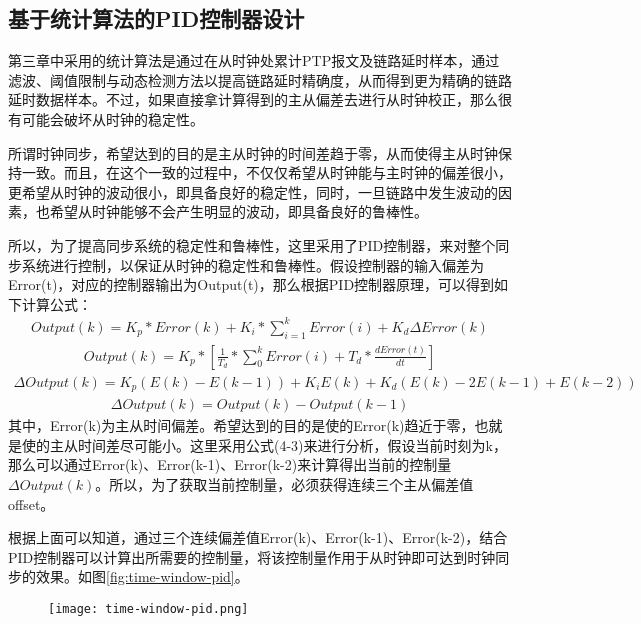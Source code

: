 \subsection{基于统计算法的PID控制器设计}
第三章中采用的统计算法是通过在从时钟处累计PTP报文及链路延时样本，通过滤波、阈值限制与动态检测方法以提高链路延时精确度，从而得到更为精确的链路延时数据样本。不过，如果直接拿计算得到的主从偏差去进行从时钟校正，那么很有可能会破坏从时钟的稳定性。

所谓时钟同步，希望达到的目的是主从时钟的时间差趋于零，从而使得主从时钟保持一致。而且，在这个一致的过程中，不仅仅希望从时钟能与主时钟的偏差很小，更希望从时钟的波动很小，即具备良好的稳定性，同时，一旦链路中发生波动的因素，也希望从时钟能够不会产生明显的波动，即具备良好的鲁棒性。

所以，为了提高同步系统的稳定性和鲁棒性，这里采用了PID控制器，来对整个同步系统进行控制，以保证从时钟的稳定性和鲁棒性。假设控制器的输入偏差为Error(t)，对应的控制器输出为Output(t)，那么根据PID控制器原理，可以得到如下计算公式：
\begin {align}
Output(k) = K_{p} * Error(k) + K_{i} * \sum_{i=1}^{k}Error(i) + K_{d}\Delta Error(k)
\end{align}
\begin {align}
Output(k) = K_{p} * [\frac{1}{T_{d}} * \sum_{0}^{k}Error(i) + T_{d} * \frac{dError(t)}{dt}]
\end{align}
\begin {align}
\Delta Output(k) = K_{p}(E(k) - E(k-1)) + K_{i}E(k) + K_{d}(E(k) - 2E(k-1) + E(k-2))
\end{align}
\begin {align}
\Delta Output(k) = Output(k) - Output(k-1)
\end{align}
其中，Error(k)为主从时间偏差。希望达到的目的是使的Error(k)趋近于零，也就是使的主从时间差尽可能小。这里采用公式(4-3)来进行分析，假设当前时刻为k，那么可以通过Error(k)、Error(k-1)、Error(k-2)来计算得出当前的控制量$\Delta Output(k)$。所以，为了获取当前控制量，必须获得连续三个主从偏差值offset。

根据上面可以知道，通过三个连续偏差值Error(k)、Error(k-1)、Error(k-2)，结合PID控制器可以计算出所需要的控制量，将该控制量作用于从时钟即可达到时钟同步的效果。如图\ref{fig:time-window-pid}。
\begin{figure}[htbp]
  \centering
  \begin{minipage}[b]{0.7\textwidth}
   \captionstyle{\centering}
   \centering
   \texttt{[image: time-window-pid.png]}
  \end{minipage}     
\end{figure}


